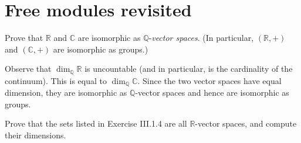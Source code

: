 \documentclass[../../master.tex]{subfiles}
\begin{document}
\section{Free modules revisited}

\begin{problem}
    Prove that $\mathbb{R}$ and $\mathbb{C}$ are isomorphic as $\mathbb{Q}$-\textit{vector spaces}.
    (In particular, $(\mathbb{R}, +)$ and $(\mathbb{C}, +)$ are isomorphic as groups.)
\end{problem}

\begin{solution}
    Observe that $\dim_{\mathbb{Q}} \mathbb{R}$ is uncountable (and in particular, is the cardinality of the continuum).
    This is equal to $\dim_{\mathbb{Q}} \mathbb{C}$.
    Since the two vector spaces have equal dimension, they are isomorphic as $\mathbb{Q}$-vector spaces and hence are isomorphic as groups.
\end{solution}

\begin{problem}
    Prove that the sets listed in Exercise III.1.4 are all $\mathbb{R}$-vector spaces, and compute their dimensions.
\end{problem}
\end{document}
